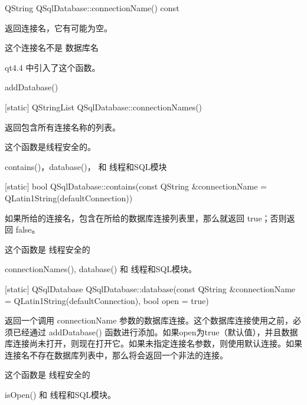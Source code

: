 QString QSqlDatabase::connectionName() const

返回连接名，它有可能为空。


\begin{notice}
这个连接名不是 数据库名
\end{notice}

qt4.4 中引入了这个函数。

\begin{notice}[另请参阅]
addDatabase()
\end{notice}


[static] QStringList QSqlDatabase::connectionNames()

返回包含所有连接名称的列表。

\begin{notice}
这个函数是线程安全的。
\end{notice} 

\begin{notice}[另请参阅]
contains()，database()， 和 线程和SQL模块
\end{notice}

[static] bool QSqlDatabase::contains(const QString \&connectionName = QLatin1String(defaultConnection))


如果所给的连接名，包含在所给的数据库连接列表里，那么就返回 true；否则返回 false。

\begin{notice}
这个函数是 线程安全的
\end{notice} 


\begin{notice}[另请参阅]
connectionNames(), database() 和 线程和SQL模块。
\end{notice}


[static] QSqlDatabase QSqlDatabase::database(const QString \&connectionName = QLatin1String(defaultConnection), bool open = true)


返回一个调用 connectionName 参数的数据库连接。这个数据库连接使用之前，必须已经通过 addDatabase() 函数进行添加。如果open为true（默认值），并且数据库连接尚未打开，则现在打开它。如果未指定连接名参数，则使用默认连接。如果连接名不存在数据库列表中，那么将会返回一个非法的连接。

\begin{notice}
这个函数是 线程安全的
\end{notice}

\begin{notice}[另请参阅]
 isOpen() 和 线程和SQL模块。
\end{notice}



